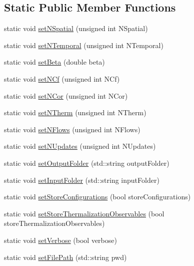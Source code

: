 \subsection*{Static Public Member Functions}
\begin{DoxyCompactItemize}
\item 
static void \mbox{\hyperlink{class_parameters_a4b2041032efc8d6e9f99a99f87543f26}{set\+N\+Spatial}} (unsigned int N\+Spatial)
\item 
static void \mbox{\hyperlink{class_parameters_a8b9ea6055d41cd08a060bc72332a63af}{set\+N\+Temporal}} (unsigned int N\+Temporal)
\item 
static void \mbox{\hyperlink{class_parameters_a8462149cb29ecf936f1f9945f5de4908}{set\+Beta}} (double beta)
\item 
static void \mbox{\hyperlink{class_parameters_a3c35caa5de4bb545a2b48af07e1756f3}{set\+N\+Cf}} (unsigned int N\+Cf)
\item 
static void \mbox{\hyperlink{class_parameters_afb3ef2dca9d24511a1904bc313fd8513}{set\+N\+Cor}} (unsigned int N\+Cor)
\item 
static void \mbox{\hyperlink{class_parameters_a97a1e5d00965cf1d552a8c8dbb45cd53}{set\+N\+Therm}} (unsigned int N\+Therm)
\item 
static void \mbox{\hyperlink{class_parameters_ae9bb965e9bfa37365c5b5ef83e95f97d}{set\+N\+Flows}} (unsigned int N\+Flows)
\item 
static void \mbox{\hyperlink{class_parameters_ae443546fea1f1ceaf3683cb368f7f5bb}{set\+N\+Updates}} (unsigned int N\+Updates)
\item 
static void \mbox{\hyperlink{class_parameters_a58dff6fbcc88bb916b9590057bf338ff}{set\+Output\+Folder}} (std\+::string output\+Folder)
\item 
static void \mbox{\hyperlink{class_parameters_a64572c0531cc65e5d1c0fc4c8295a572}{set\+Input\+Folder}} (std\+::string input\+Folder)
\item 
static void \mbox{\hyperlink{class_parameters_a7ab55c1529015de4c5c182cfa9f004e8}{set\+Store\+Configurations}} (bool store\+Configurations)
\item 
static void \mbox{\hyperlink{class_parameters_a84290346277f15c8241c035b7aa452ad}{set\+Store\+Thermalization\+Observables}} (bool store\+Thermalization\+Observables)
\item 
static void \mbox{\hyperlink{class_parameters_aa0ac9d09db506844758e0a5d23dedeb4}{set\+Verbose}} (bool verbose)
\item 
static void \mbox{\hyperlink{class_parameters_a5afe30ba482014c176433bb183a68976}{set\+File\+Path}} (std\+::string pwd)

\end{DoxyCompactItemize}
